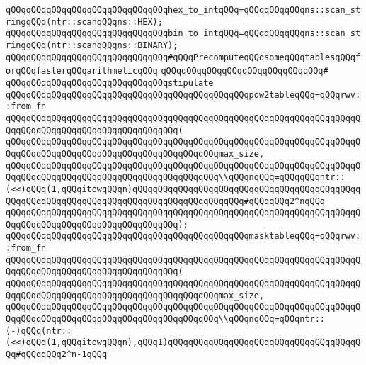 \newline
\verb|qQQqqQQqqQQqqQQqqQQqqQQqqQQqqQQqhex_to_intqQQq=qQQqqQQqqQQqns::scan_stringqQQq(ntr::scanqQQqns::HEX);|\newline
\verb|qQQqqQQqqQQqqQQqqQQqqQQqqQQqqQQqbin_to_intqQQq=qQQqqQQqqQQqns::scan_stringqQQq(ntr::scanqQQqns::BINARY);|\newline
\newline
\verb|qQQqqQQqqQQqqQQqqQQqqQQqqQQqqQQq#qQQqPrecomputeqQQqsomeqQQqtablesqQQqforqQQqfasterqQQqarithmeticqQQq|\newline
\verb|qQQqqQQqqQQqqQQqqQQqqQQqqQQqqQQq#|\newline
\verb|qQQqqQQqqQQqqQQqqQQqqQQqqQQqqQQqstipulate|\newline
\newline
\verb|qQQqqQQqqQQqqQQqqQQqqQQqqQQqqQQqqQQqqQQqqQQqqQQqpow2tableqQQq=qQQqrwv::from_fn|\newline
\verb|qQQqqQQqqQQqqQQqqQQqqQQqqQQqqQQqqQQqqQQqqQQqqQQqqQQqqQQqqQQqqQQqqQQqqQQqqQQqqQQqqQQqqQQqqQQqqQQqqQQqqQQq(|\newline
\verb|qQQqqQQqqQQqqQQqqQQqqQQqqQQqqQQqqQQqqQQqqQQqqQQqqQQqqQQqqQQqqQQqqQQqqQQqqQQqqQQqqQQqqQQqqQQqqQQqqQQqqQQqqQQqqQQqmax_size,|\newline
\newline
\verb|qQQqqQQqqQQqqQQqqQQqqQQqqQQqqQQqqQQqqQQqqQQqqQQqqQQqqQQqqQQqqQQqqQQqqQQqqQQqqQQqqQQqqQQqqQQqqQQqqQQqqQQqqQQqqQQq\\qQQqnqQQq=qQQqqQQqntr::(<<)qQQq(1,qQQqitowqQQqn)qQQqqQQqqQQqqQQqqQQqqQQqqQQqqQQqqQQqqQQqqQQqqQQqqQQqqQQqqQQqqQQqqQQqqQQqqQQqqQQqqQQqqQQqqQQq#qQQqqQQq2^nqQQq|\newline
\verb|qQQqqQQqqQQqqQQqqQQqqQQqqQQqqQQqqQQqqQQqqQQqqQQqqQQqqQQqqQQqqQQqqQQqqQQqqQQqqQQqqQQqqQQqqQQqqQQqqQQqqQQq);|\newline
\newline
\verb|qQQqqQQqqQQqqQQqqQQqqQQqqQQqqQQqqQQqqQQqqQQqqQQqmasktableqQQq=qQQqrwv::from_fn|\newline
\verb|qQQqqQQqqQQqqQQqqQQqqQQqqQQqqQQqqQQqqQQqqQQqqQQqqQQqqQQqqQQqqQQqqQQqqQQqqQQqqQQqqQQqqQQqqQQqqQQqqQQqqQQq(|\newline
\verb|qQQqqQQqqQQqqQQqqQQqqQQqqQQqqQQqqQQqqQQqqQQqqQQqqQQqqQQqqQQqqQQqqQQqqQQqqQQqqQQqqQQqqQQqqQQqqQQqqQQqqQQqqQQqqQQqmax_size,|\newline
\newline
\verb|qQQqqQQqqQQqqQQqqQQqqQQqqQQqqQQqqQQqqQQqqQQqqQQqqQQqqQQqqQQqqQQqqQQqqQQqqQQqqQQqqQQqqQQqqQQqqQQqqQQqqQQqqQQqqQQq\\qQQqnqQQq=qQQqntr::(-)qQQq(ntr::(<<)qQQq(1,qQQqitowqQQqn),qQQq1)qQQqqQQqqQQqqQQqqQQqqQQqqQQqqQQqqQQqqQQq#qQQqqQQq2^n-1qQQq|\newline
